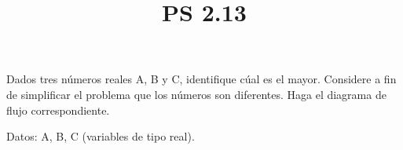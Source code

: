 \documentclass[11pt]{amsart}
\title{PS 2.13}
\begin{document}
\maketitle
\noindent Dados tres números reales A, B y C, identifique cúal es el mayor. Considere a fin de simplificar el problema que los números son diferentes. Haga el diagrama de flujo correspondiente.
\newline

\noindent Datos: A, B, C (variables de tipo real).
\end{document}
